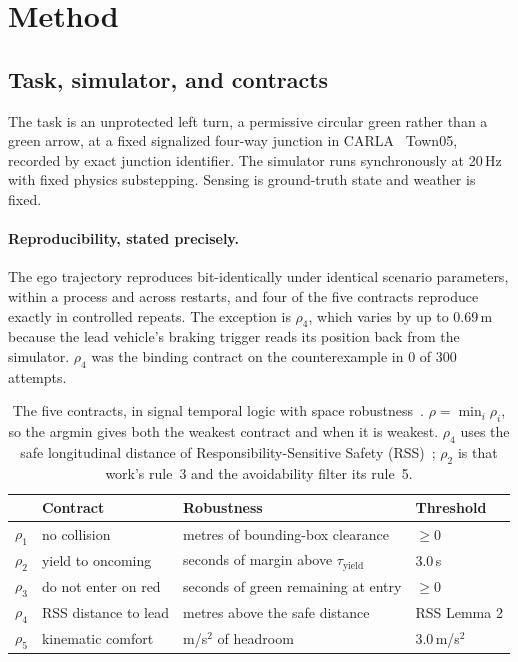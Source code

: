 \documentclass{article}
\newcommand{\rhoc}[1]{\rho_{#1}}
\begin{document}
\section{Method}
\label{sec:method}

\subsection{Task, simulator, and contracts}

The task is an unprotected left turn, a permissive circular green rather than a
green arrow, at a fixed signalized four-way junction in
CARLA~\citep{dosovitskiy2017carla} Town05, recorded by exact junction
identifier. The simulator runs synchronously at \mbox{20\,Hz} with fixed physics
substepping. Sensing is ground-truth state and weather is fixed.

\paragraph{Reproducibility, stated precisely.}
The ego trajectory reproduces bit-identically under identical scenario
parameters, within a process and across restarts, and four of the five contracts
reproduce exactly in controlled repeats. The exception is $\rhoc{4}$, which varies by up to
\mbox{0.69\,m} because the lead vehicle's braking trigger reads its position back
from the simulator. $\rhoc{4}$ was the binding contract on the counterexample in
$0$ of $300$ attempts.

\begin{table}[t]
\centering
\small
\caption{The five contracts, in signal temporal logic with space
robustness~\citep{donze2010robust}. $\rho = \min_i \rhoc{i}$, so the argmin gives
both the weakest contract and when it is weakest. $\rhoc{4}$ uses the safe
longitudinal distance of Responsibility-Sensitive Safety
(RSS)~\citep{shalevshwartz2017rss}; $\rhoc{2}$ is that work's
rule~3 and the avoidability filter its rule~5.}
\label{tab:contracts}
\begin{tabular}{@{}llll@{}}
\toprule
& \textbf{Contract} & \textbf{Robustness} & \textbf{Threshold} \\
\midrule
$\rhoc{1}$ & no collision & metres of bounding-box clearance & $\geq 0$ \\
$\rhoc{2}$ & yield to oncoming & seconds of margin above $\tau_{\text{yield}}$ & 3.0\,s \\
$\rhoc{3}$ & do not enter on red & seconds of green remaining at entry & $\geq 0$ \\
$\rhoc{4}$ & RSS distance to lead & metres above the safe distance & RSS Lemma 2 \\
$\rhoc{5}$ & kinematic comfort & m/s$^2$ of headroom & 3.0\,m/s$^2$ \\
\bottomrule
\end{tabular}
\end{table}
\end{document}
